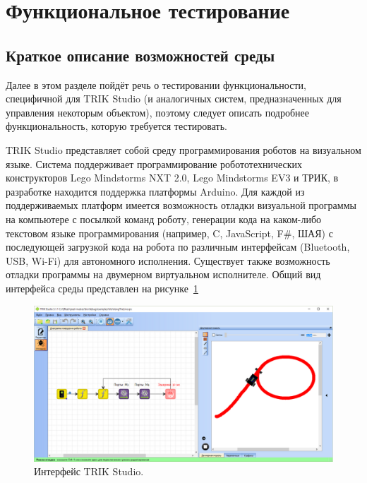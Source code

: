 \documentclass[conference]{IEEEtran}
\begin{document}
\section{Функциональное тестирование}
\subsection{Краткое описание возможностей среды}
Далее в этом разделе пойдёт речь о тестировании функциональности, специфичной для TRIK Studio (и аналогичных 
систем, предназначенных для управления некоторым объектом), поэтому следует описать подробнее функциональность, 
которую требуется тестировать. 

TRIK Studio представляет собой среду программирования роботов на визуальном языке. Система поддерживает программирование 
робототехнических конструкторов Lego Mindstorms NXT 2.0, Lego Mindstorms EV3 и ТРИК, в разработке находится 
поддержка платформы Arduino. Для каждой из поддерживаемых платформ имеется возможность отладки визуальной 
программы на компьютере с посылкой команд роботу, генерации кода на каком-либо текстовом языке программирования 
(например, C, JavaScript, F\#, ШАЯ) с последующей загрузкой кода на робота по различным интерфейсам (Bluetooth, 
USB, Wi-Fi) для автономного исполнения. Существует также возможность отладки программы на двумерном виртуальном исполнителе.
Общий вид интерфейса среды представлен на рисунке~\ref{image:trikStudio}

\begin{figure}[!t]
	\centering
	\includegraphics[width=7in]{trikStudio.png}
	\caption{Интерфейс TRIK Studio.}
	\label{image:trikStudio}
\end{figure}
\end{document}
